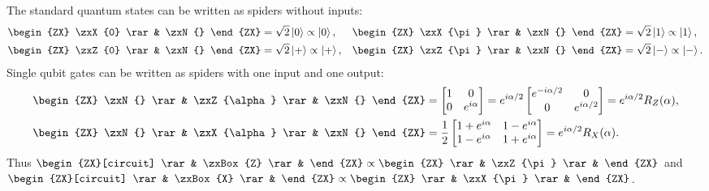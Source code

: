 \begin{example}
\label{ex:ex-zx}
The standard quantum states can be written as spiders without inputs:
\begin{align}
    \begin{ZX}
        \zxX{0} \rar & \zxN{}
    \end{ZX}
    &= \sqrt{2} \ket{0} \propto \ket{0},
    &&\begin{ZX}
        \zxX{\pi} \rar & \zxN{}
    \end{ZX}  
    = \sqrt{2} \ket{1} \propto \ket{1}, \\
    \begin{ZX}
        \zxZ{0} \rar & \zxN{}
    \end{ZX}
    &= \sqrt{2} \ket{+} \propto \ket{+},
    &&\begin{ZX}
        \zxZ{\pi} \rar & \zxN{}
    \end{ZX}
    = \sqrt{2} \ket{-} \propto \ket{-}.
\end{align}
Single qubit gates can be written as spiders with one input and one output:
\begin{align}
    \begin{ZX}
        \zxN{} \rar & \zxZ{\alpha} \rar & \zxN{}
    \end{ZX}
    &= \begin{bmatrix}
        1 & 0 \\ 0 & e^{i\alpha}
    \end{bmatrix}
    = e^{i\alpha/2}\begin{bmatrix}
        e^{-i\alpha/2} & 0 \\ 0 & e^{i\alpha/2}
    \end{bmatrix}
    = e^{i\alpha/2} R_Z(\alpha), \\
    \begin{ZX}
        \zxN{} \rar & \zxX{\alpha} \rar & \zxN{}
    \end{ZX}
    &= \frac{1}{2} \begin{bmatrix}
        1 + e^{i\alpha} & 1 - e^{i\alpha} \\ 1 - e^{i\alpha} & 1 + e^{i\alpha}
    \end{bmatrix}
    = e^{i\alpha/2} R_X(\alpha).
\end{align}
Thus $\begin{ZX}[circuit]
    \rar & \zxBox{Z} \rar &
\end{ZX} \propto \begin{ZX}
    \rar & \zxZ{\pi} \rar &
\end{ZX}$ and $\begin{ZX}[circuit]
    \rar & \zxBox{X} \rar &
\end{ZX} \propto \begin{ZX}
    \rar & \zxX{\pi} \rar &
\end{ZX}$. 
\end{example}


